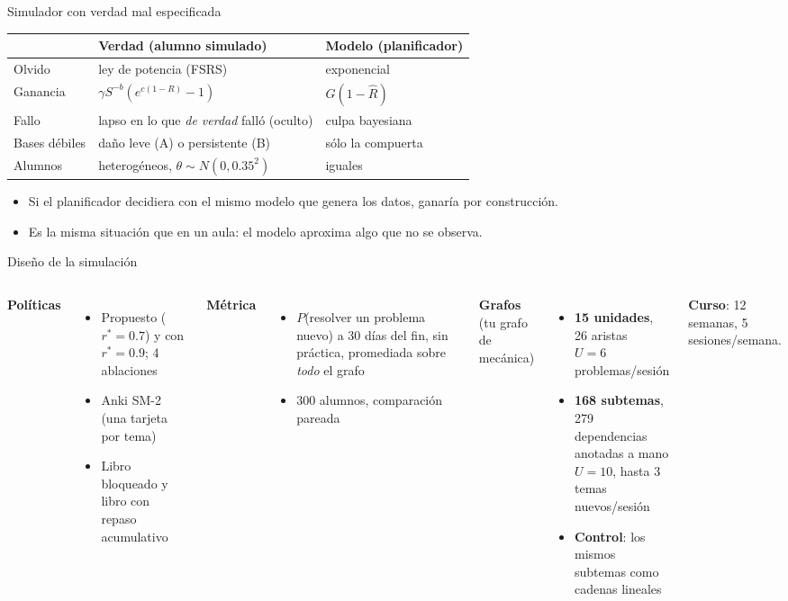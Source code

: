 \documentclass[aspectratio=169,11pt]{beamer}
\newcommand{\Rh}{\hat R}
\newcommand{\rstar}{r^{\ast}}
\begin{document}
\begin{frame}{Simulador con verdad mal especificada}
\small
\begin{tabular}{@{}lll@{}}
\toprule
& \textbf{Verdad} (alumno simulado) & \textbf{Modelo} (planificador) \\
\midrule
Olvido & ley de potencia (FSRS) & exponencial \\
Ganancia & $\gamma S^{-b}(e^{c(1-R)}-1)$ & $G(1-\Rh)$ \\
Fallo & lapso en lo que \emph{de verdad} falló (oculto) & culpa bayesiana \\
Bases débiles & daño leve (A) o persistente (B) & sólo la compuerta \\
Alumnos & heterogéneos, $\theta\sim N(0,0.35^2)$ & iguales \\
\bottomrule
\end{tabular}
\vspace{4mm}
\begin{itemize}
\item Si el planificador decidiera con el mismo modelo que genera los datos, ganaría \alert{por construcción}.
\item Es la misma situación que en un aula: el modelo aproxima algo que no se observa.
\end{itemize}
\end{frame}

\begin{frame}{Diseño de la simulación}
\footnotesize
\begin{columns}[T]
\textbf{Políticas}
\begin{itemize}\small
\item Propuesto ($\rstar=0.7$) y con $\rstar=0.9$; 4 ablaciones
\item Anki SM-2 (una tarjeta por tema)
\item Libro bloqueado y libro con repaso acumulativo
\end{itemize}
\textbf{Métrica}
\begin{itemize}\small
\item $P$(resolver un problema nuevo) a 30 días del fin, sin práctica, promediada sobre \emph{todo} el grafo
\item 300 alumnos, comparación pareada
\end{itemize}
\textbf{Grafos} (tu grafo de mecánica)
\begin{itemize}\small
\item \textbf{15 unidades}, 26 aristas\\$U=6$ problemas/sesión
\item \textbf{168 subtemas}, 279 dependencias anotadas a mano\\$U=10$, hasta 3 temas nuevos/sesión
\item \textbf{Control}: los mismos subtemas como cadenas lineales
\end{itemize}
\textbf{Curso}: 12 semanas, 5 sesiones/semana.
\end{columns}
\end{frame}
\end{document}
